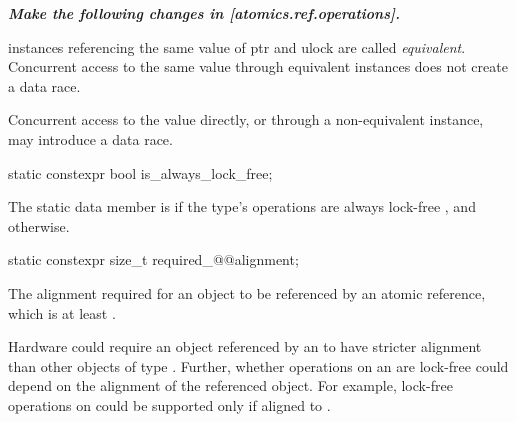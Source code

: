 \textbf{\textit{Make the following changes in [atomics.ref.operations].}} \\

\begin{addedblock}
 instances referencing the same value of ptr and ulock are 
called \textit{equivalent}. Concurrent access to the same value through 
equivalent  instances does not create a data race. 
\begin{note} Concurrent access to the value directly, or through a non-equivalent
 instance, may introduce a data race.
\end{note}
\end{addedblock}

\begin{itemdecl}
static constexpr bool is_always_lock_free;
\end{itemdecl}

\begin{itemdescr}
\pnum
The static data member  is 
if the  type's operations are always lock-free
,
and  otherwise.
\end{itemdescr}


\begin{itemdecl}
static constexpr size_t required_@@alignment;
\end{itemdecl}

\begin{itemdescr}
\pnum
The alignment required for an object to be referenced  by an atomic reference,
which is at least .

\pnum
\begin{note}
Hardware could require an object
referenced by an 
to have stricter alignment
than other objects of type .
Further, whether operations on an 
are lock-free could depend on the alignment of the referenced object.
For example, lock-free operations on 
could be supported only if aligned to .
\end{note}
\end{itemdescr}



